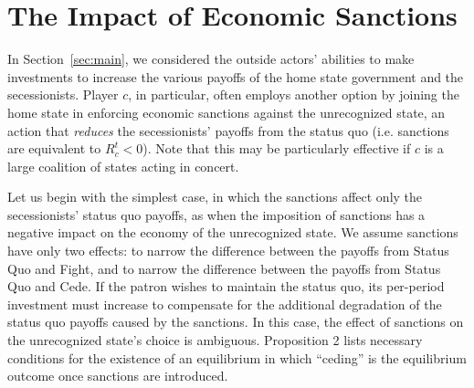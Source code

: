 \section{The Impact of Economic Sanctions}
\label{sec:sanctions}

In Section~\ref{sec:main}, we considered the outside actors' abilities to make investments to increase the various payoffs of the home state government and the secessionists. Player $c$, in particular, often employs another option by joining the home state in enforcing economic sanctions against the unrecognized state, an action that \emph{reduces} the secessionists' payoffs from the status quo (i.e. sanctions are equivalent to $R_c^t < 0$). Note that this may be particularly effective if $c$ is a large coalition of states acting in concert. 

Let us begin with the simplest case, in which the sanctions affect only the secessionists' status quo payoffs, as when the imposition of sanctions has a negative impact on the economy of the unrecognized state. We assume sanctions have only two effects: to narrow the difference between the payoffs from Status Quo and Fight, and to narrow the difference between the payoffs from Status Quo and Cede. If the patron wishes to maintain the status quo, its per-period investment must increase to compensate for the additional degradation of the status quo payoffs caused by the sanctions. In this case, the effect of sanctions on the unrecognized state's choice is ambiguous. Proposition 2 lists necessary conditions for the existence of an equilibrium in which ``ceding'' is the equilibrium outcome once sanctions are introduced.

